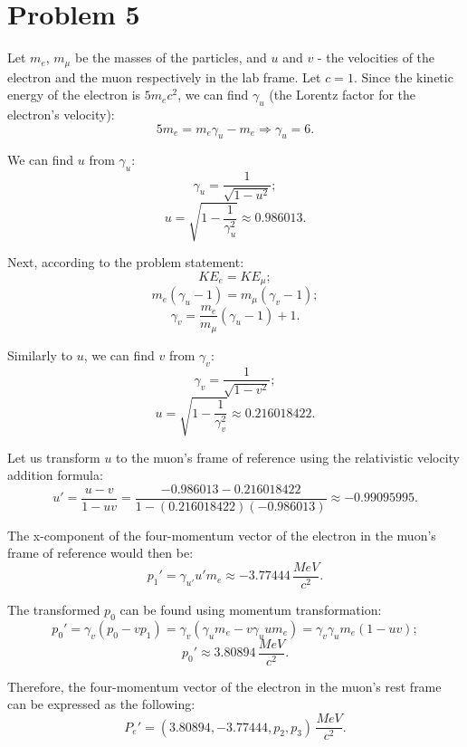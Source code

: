 \documentclass{article}
\begin{document}
\section*{Problem 5}
Let $m_e$, $m_\mu$ be the masses of the particles, and $u$ and $v$ - the velocities of the electron and the muon respectively in the lab frame. Let $c=1$. Since the kinetic energy of the electron is $5m_ec^2$, we can find $\gamma_u$ (the Lorentz factor for the electron's velocity):
\[
5m_e = m_e\gamma_u - m_e \Rightarrow \gamma_u = 6.
\]

We can find $u$ from $\gamma_u$:
\[
\gamma_u = \frac{1}{\sqrt{1 - u^2}};
\]
\[
u = \sqrt{1 - \frac{1}{\gamma_u^2}} \approx 0.986013.
\]

Next, according to the problem statement:
\[
KE_e = KE_\mu;
\]
\[
m_e(\gamma_u - 1) = m_\mu(\gamma_v - 1);
\]
\[
\gamma_v = \frac{m_e}{m_\mu}(\gamma_u - 1) + 1.
\]

Similarly to $u$, we can find $v$ from $\gamma_v$:
\[
\gamma_v = \frac{1}{\sqrt{1 - v^2}};
\]
\[
u = \sqrt{1 - \frac{1}{\gamma_v^2}} \approx 0.216018422.
\]

Let us transform $u$ to the muon's frame of reference using the relativistic velocity addition formula:
\[
u\prime = \frac{u-v}{1-uv} = \frac{-0.986013 - 0.216018422}{1 - (0.216018422)(-0.986013)} \approx -0.99095995.
\]

The x-component of the four-momentum vector of the electron in the muon's frame of reference would then be:
\[
p_1\prime = \gamma_{u\prime} u\prime m_e \approx -3.77444\,\frac{MeV}{c^2}.
\]

The transformed $p_0$ can be found using momentum transformation:
\[
p_0\prime = \gamma_v(p_0 - vp_1) = \gamma_v(\gamma_u m_e - v \gamma_u u m_e) = \gamma_v \gamma_u m_e (1 - uv);
\]
\[
p_0\prime \approx 3.80894\,\frac{MeV}{c^2}.
\]

Therefore, the four-momentum vector of the electron in the muon's rest frame can be expressed as the following:
\[
P_e\prime = (3.80894, -3.77444, p_2, p_3)\,\frac{MeV}{c^2}.
\]
\end{document}
